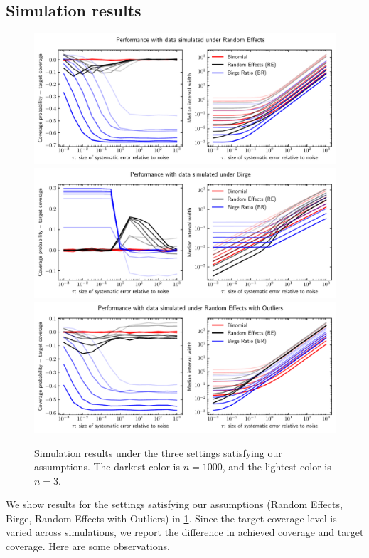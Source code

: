 \documentclass[12pt]{article}
\begin{document}
\subsection{Simulation results}\label{simulation-results}

\begin{figure}[h]
\centering
\includegraphics[width=\textwidth]{figs/performance_random_effects.pdf}
\includegraphics[width=\textwidth]{figs/performance_birge.pdf}
\includegraphics[width=\textwidth]{figs/performance_random_effects_outliers.pdf}
\label{fig:sim-results}
\caption{Simulation results under the three settings satisfying our assumptions. The darkest color is $n=1000$, and the lightest color is $n=3$.}
\end{figure}

We show results for the settings satisfying our assumptions (Random Effects, Birge, Random Effects with Outliers) in \ref{fig:sim-results}. Since the target coverage level is varied across simulations, we report the difference in achieved coverage and target coverage. Here are some observations.
\end{document}
